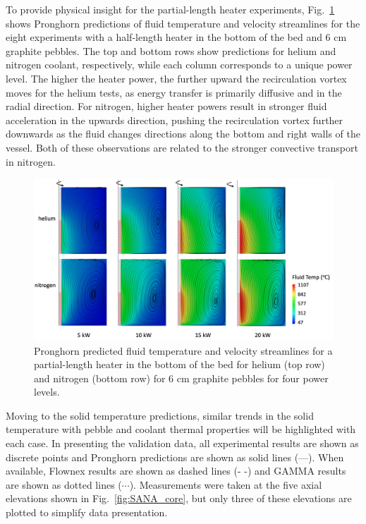 To provide physical insight for the partial-length heater experiments, Fig.\ \ref{fig:streamlines1} shows Pronghorn predictions of fluid temperature and velocity streamlines for the eight experiments with a half-length heater in the bottom of the bed and 6 \si{\centi\meter} graphite pebbles. The top and bottom rows show predictions for helium and nitrogen coolant, respectively, while each column corresponds to a unique power level. The higher the heater power, the further upward the recirculation vortex moves for the helium tests, as energy transfer is primarily diffusive and in the radial direction. For nitrogen, higher heater powers result in stronger fluid acceleration in the upwards direction, pushing the recirculation vortex further downwards as the fluid changes directions along the bottom and right walls of the vessel. Both of these observations are related to the stronger convective transport in nitrogen.

\begin{figure}[h!]
\centering
\centerline{
\includegraphics[height=0.6\linewidth]{figs/sana_bottom_vel.png}}
\caption{Pronghorn predicted fluid temperature and velocity streamlines for a partial-length heater in the bottom of the bed for helium (top row) and nitrogen (bottom row) for 6 \si{\centi\meter} graphite pebbles for four power levels.}
\label{fig:streamlines1}
\end{figure}

Moving to the solid temperature predictions, similar trends in the solid temperature with pebble and coolant thermal properties will be highlighted with each case. In presenting the validation data, all experimental results are shown as discrete points and Pronghorn predictions are shown as solid lines (---). When available, Flownex results are shown as dashed lines (- -) and GAMMA results are shown as dotted lines ($\cdots$). Measurements were taken at the five axial elevations shown in Fig.\ \ref{fig:SANA_core}, but only three of these elevations are plotted to simplify data presentation.

